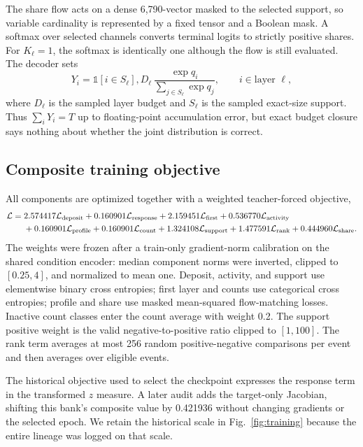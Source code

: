 \documentclass[11pt]{article}
\begin{document}
The share flow acts on a dense 6,790-vector masked to the selected support, so variable cardinality is represented by a fixed tensor and a Boolean mask. A softmax over selected channels converts terminal logits to strictly positive shares. For $K_\ell=1$, the softmax is identically one although the flow is still evaluated. The decoder sets
\begin{equation}
 Y_i=\mathbb 1[i\in S_\ell],D_\ell\,
 \frac{\exp q_i}{\sum_{j\in S_\ell}\exp q_j},\qquad i\in\text{layer }\ell,
\end{equation}
where $D_\ell$ is the sampled layer budget and $S_\ell$ is the sampled exact-size support. Thus $\sum_iY_i=T$ up to floating-point accumulation error, but exact budget closure says nothing about whether the joint distribution is correct.

\subsection{Composite training objective}

All components are optimized together with a weighted teacher-forced objective,
\begin{align}
\mathcal L={}&2.574417\mathcal L_{\rm deposit}
+0.160901\mathcal L_{\rm response}
+2.159451\mathcal L_{\rm first}
+0.536770\mathcal L_{\rm activity}\nonumber\\
&+0.160901\mathcal L_{\rm profile}
+0.160901\mathcal L_{\rm count}
+1.324108\mathcal L_{\rm support}
+1.477591\mathcal L_{\rm rank}
+0.444960\mathcal L_{\rm share}.
\label{eq:objective}
\end{align}
The weights were frozen after a train-only gradient-norm calibration on the shared condition encoder: median component norms were inverted, clipped to $[0.25,4]$, and normalized to mean one. Deposit, activity, and support use elementwise binary cross entropies; first layer and counts use categorical cross entropies; profile and share use masked mean-squared flow-matching losses. Inactive count classes enter the count average with weight 0.2. The support positive weight is the valid negative-to-positive ratio clipped to $[1,100]$. The rank term averages at most 256 random positive-negative comparisons per event and then averages over eligible events.

The historical objective used to select the checkpoint expresses the response term in the transformed $z$ measure. A later audit adds the target-only Jacobian, shifting this bank's composite value by 0.421936 without changing gradients or the selected epoch. We retain the historical scale in Fig.~\ref{fig:training} because the entire lineage was logged on that scale.
\end{document}
